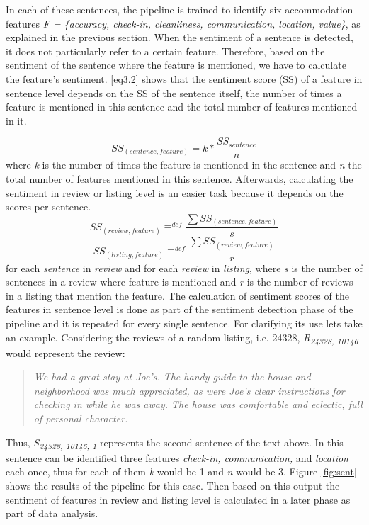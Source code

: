 In each of these sentences, the pipeline is trained to identify six accommodation features \textit{F = \{accuracy, check-in, cleanliness, communication, location, value\}}, as explained in the previous section. When the sentiment of a sentence is detected, it does not particularly refer to a certain feature. Therefore, based on the sentiment of the sentence where the feature is mentioned, we have to calculate the feature's sentiment.
\ref{eq3.2} shows that the sentiment score (SS) of a feature in sentence level depends on the SS of the sentence itself, the number of times a feature is mentioned in this sentence and the total number of features mentioned in it.
%

\begin{equation}
SS_{(sentence,feature)} = k * \frac{SS_{sentence}}{n}
\label{eq3.2}
\end{equation}
where \textit{k} is the number of times the feature is mentioned in the sentence and \textit{n} the total number of features mentioned in this sentence. Afterwards, calculating the sentiment in review or listing level is an easier task because it depends on the scores per sentence.
 \begin{equation}
 SS_{(review,feature)} \equiv^{def} \frac{\sum SS_{(sentence,feature)}}{s} 
\label{eq3.3}
\end{equation}
\begin{equation}
  SS_{(listing,feature)} \equiv^{def} \frac{\sum SS_{(review,feature)}}{r}
  \label{eq3.4}
\end{equation}
for each \textit{sentence} in \textit{review} and for each \textit{review} in \textit{listing}, where \textit{s} is the number of sentences in a review where feature is mentioned  and \textit{r} is the number of reviews in a listing that mention the feature.
The calculation of sentiment scores of the features in sentence level is done as part of the sentiment detection phase of the pipeline and it is repeated for every single sentence. For clarifying its use lets take an example. Considering the reviews of a random listing, i.e. 24328,  \textit{R\textsubscript{24328, 10146}} would represent the review:
\begin{quote}
\textit{We had a great stay at Joe's. The handy guide to the house and neighborhood was much appreciated, as were Joe's clear instructions for checking in while he was away. The house was comfortable and eclectic, full of personal character.}
\end{quote}
Thus, \textit{S\textsubscript{24328, 10146, 1}} represents the second sentence of the text above. In this sentence can be identified three features \textit{check-in, communication,} and \textit{location} each once, thus for each of them \textit{k} would be 1 and \textit{n} would be 3. Figure \ref{fig:sent} shows the results of the pipeline for this case. Then based on this output the sentiment of features in review and listing level is calculated in a later phase as part of data analysis.
